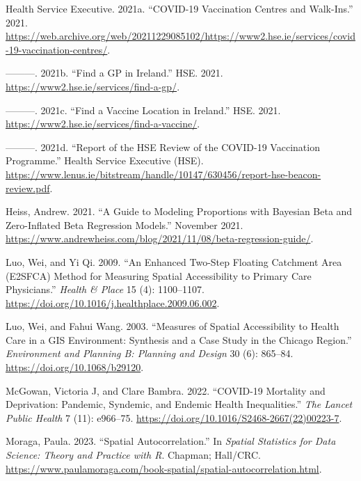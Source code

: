 \documentclass{article}
\newlength{\cslhangindent}
\newenvironment{CSLReferences}[2] %
 {\begin{list}{}{%
  \setlength{\itemindent}{0pt}
  \setlength{\leftmargin}{0pt}
  \setlength{\parsep}{0pt}
  \ifodd #1
   \setlength{\leftmargin}{\cslhangindent}
   \setlength{\itemindent}{-1\cslhangindent}
  \fi
  \setlength{\itemsep}{#2\baselineskip}}}
 {\end{list}}
\begin{document}
\begin{CSLReferences}{1}{0}
Health Service Executive. 2021a. {``{COVID-19} Vaccination Centres and
Walk-Ins.''} 2021.
\url{https://web.archive.org/web/20211229085102/https://www2.hse.ie/services/covid-19-vaccination-centres/}.

---------. 2021b. {``Find a {GP} in {Ireland}.''} HSE. 2021.
\url{https://www2.hse.ie/services/find-a-gp/}.

---------. 2021c. {``Find a Vaccine Location in {Ireland}.''} HSE. 2021.
\url{https://www2.hse.ie/services/find-a-vaccine/}.

---------. 2021d. {``Report of the HSE Review of the COVID-19
Vaccination Programme.''} Health Service Executive (HSE).
\url{https://www.lenus.ie/bitstream/handle/10147/630456/report-hse-beacon-review.pdf}.

Heiss, Andrew. 2021. {``A Guide to Modeling Proportions with {Bayesian}
Beta and Zero-Inflated Beta Regression Models.''} November 2021.
\url{https://www.andrewheiss.com/blog/2021/11/08/beta-regression-guide/}.

Luo, Wei, and Yi Qi. 2009. {``An Enhanced Two-Step Floating Catchment
Area ({E2SFCA}) Method for Measuring Spatial Accessibility to Primary
Care Physicians.''} \emph{Health \& Place} 15 (4): 1100--1107.
\url{https://doi.org/10.1016/j.healthplace.2009.06.002}.

Luo, Wei, and Fahui Wang. 2003. {``Measures of {Spatial} {Accessibility}
to {Health} {Care} in a {GIS} {Environment}: {Synthesis} and a {Case}
{Study} in the {Chicago} {Region}.''} \emph{Environment and Planning B:
Planning and Design} 30 (6): 865--84.
\url{https://doi.org/10.1068/b29120}.

McGowan, Victoria J, and Clare Bambra. 2022. {``{COVID}-19 Mortality and
Deprivation: Pandemic, Syndemic, and Endemic Health Inequalities.''}
\emph{The Lancet Public Health} 7 (11): e966--75.
\url{https://doi.org/10.1016/S2468-2667(22)00223-7}.

Moraga, Paula. 2023. {``Spatial Autocorrelation.''} In \emph{Spatial
Statistics for Data Science: Theory and Practice with {R}}. Chapman;
Hall/CRC.
\url{https://www.paulamoraga.com/book-spatial/spatial-autocorrelation.html}.


\end{CSLReferences}
\end{document}
